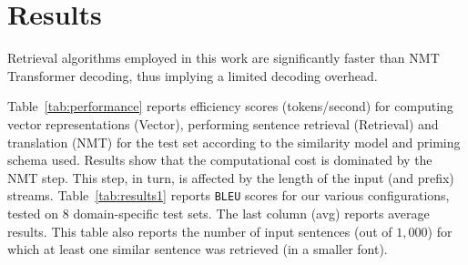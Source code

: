 \section{Results}
\label{sec:results}

Retrieval algorithms employed in this work are significantly faster than NMT Transformer decoding, thus implying a limited decoding overhead.
%

\begin{table}[h!]
\begin{center}
\end{center}
\caption{\label{tab:performance} Efficiency (tokens/second) of each step for different inference configurations. All steps run on CPU (16 cores). K stands for thousands.}
\end{table}

Table~\ref{tab:performance} reports efficiency scores (tokens/second) for computing vector representations (Vector), performing sentence retrieval (Retrieval) and translation (NMT) for the  test set according to the similarity model and priming schema used. Results show that the computational cost is dominated by the NMT step. This step, in turn, is affected by the length of the input (and prefix) streams. Table~\ref{tab:results1} reports \texttt{BLEU} scores for our various configurations, tested on $8$ domain-specific test sets. The last column (avg) reports average results. This table also reports the number of input sentences (out of $1,000$)  for which at least one similar sentence was retrieved (in a smaller font).

